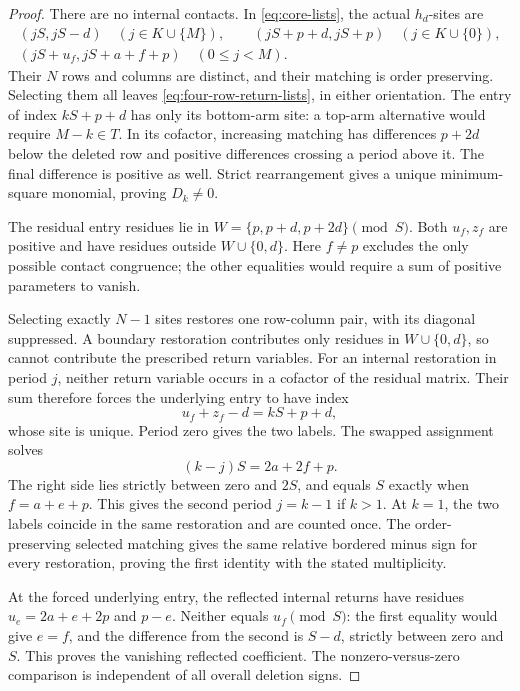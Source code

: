 \documentclass[11pt,a4paper]{amsart}
\numberwithin{equation}{section}
\theoremstyle{plain}
\theoremstyle{definition}
\begin{document}
\begin{proof}
There are no internal contacts.  In \eqref{eq:core-lists}, the actual \(h_d\)-sites are
\[
 \begin{gathered}
 (jS,jS-d)\quad(j\in K\cup\{M\}),\qquad
 (jS+p+d,jS+p)\quad(j\in K\cup\{0\}),\\
 (jS+u_f,jS+a+f+p)\quad(0\le j<M).
 \end{gathered}
\]
Their \(N\) rows and columns are distinct, and their matching is order preserving.  Selecting them all leaves \eqref{eq:four-row-return-lists}, in either orientation.  The entry of index \(kS+p+d\) has only its bottom-arm site: a top-arm alternative would require \(M-k\in T\).  In its cofactor, increasing matching has differences \(p+2d\) below the deleted row and positive differences crossing a period above it.  The final difference is positive as well.  Strict rearrangement gives a unique minimum-square monomial, proving \(D_k\ne0\).

The residual entry residues lie in \(W=\{p,p+d,p+2d\}\pmod S\).  Both \(u_f,z_f\) are positive and have residues outside \(W\cup\{0,d\}\).  Here \(f\ne p\) excludes the only possible contact congruence; the other equalities would require a sum of positive parameters to vanish.

Selecting exactly \(N-1\) sites restores one row-column pair, with its diagonal suppressed.  A boundary restoration contributes only residues in \(W\cup\{0,d\}\), so cannot contribute the prescribed return variables.  For an internal restoration in period \(j\), neither return variable occurs in a cofactor of the residual matrix.  Their sum therefore forces the underlying entry to have index
\[
 u_f+z_f-d=kS+p+d,
\]
whose site is unique.  Period zero gives the two labels.  The swapped assignment solves
\[
 (k-j)S=2a+2f+p.
\]
The right side lies strictly between zero and \(2S\), and equals \(S\) exactly when \(f=a+e+p\).  This gives the second period \(j=k-1\) if \(k>1\).  At \(k=1\), the two labels coincide in the same restoration and are counted once.  The order-preserving selected matching gives the same relative bordered minus sign for every restoration, proving the first identity with the stated multiplicity.

At the forced underlying entry, the reflected internal returns have residues \(u_e=2a+e+2p\) and \(p-e\).  Neither equals \(u_f\pmod S\): the first equality would give \(e=f\), and the difference from the second is \(S-d\), strictly between zero and \(S\).  This proves the vanishing reflected coefficient.  The nonzero-versus-zero comparison is independent of all overall deletion signs.
\end{proof}
\end{document}
